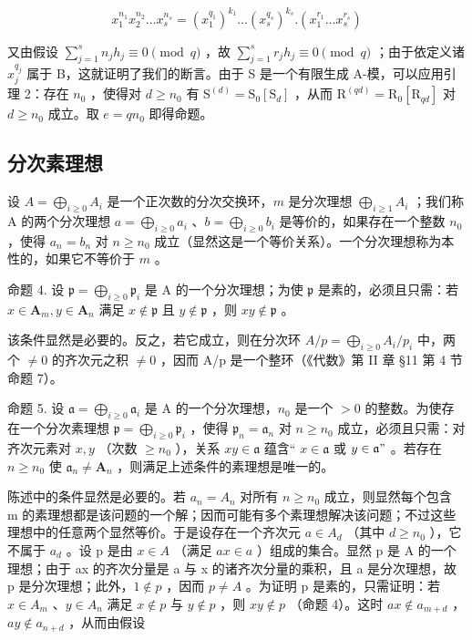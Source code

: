 \[
x _ {1} ^ {n _ {1}} x _ {2} ^ {n _ {2}} \dots x _ {s} ^ {n _ {s}} = (x _ {1} ^ {q _ {1}}) ^ {k _ {1}} \dots (x _ {s} ^ {q _ {s}}) ^ {k _ {s}}. (x _ {1} ^ {r _ {1}} \dots x _ {s} ^ {r _ {s}})
\]

又由假设 \(\sum_{j=1}^{s} n_j h_j \equiv 0 \pmod{q}\) ，故 \(\sum_{j=1}^{s} r_j h_j \equiv 0 \pmod{q}\) ；由于依定义诸 \(x_j^{q_j}\) 属于 B，这就证明了我们的断言。由于 S 是一个有限生成 A-模，可以应用引理 2：存在 \(n_0\) ，使得对 \(d \geqslant n_0\) 有 \(\mathrm{S}^{(d)} = \mathrm{S}_0[\mathrm{S}_d]\) ，从而 \(\mathrm{R}^{(qd)} = \mathrm{R}_0[\mathrm{R}_{qd}]\) 对 \(d \geqslant n_0\) 成立。取 \(e = q n_0\) 即得命题。

\subsection{分次素理想}

设 \(A = \bigoplus_{i \geqslant 0} A_i\) 是一个正次数的分次交换环，\(m\) 是分次理想 \(\bigoplus_{i \geqslant 1} A_i\) ；我们称 A 的两个分次理想 \(a = \bigoplus_{i \geqslant 0} a_i\) 、\(b = \bigoplus_{i \geqslant 0} b_i\) 是等价的，如果存在一个整数 \(n_0\) ，使得 \(a_n = b_n\) 对 \(n \geqslant n_0\) 成立（显然这是一个等价关系）。一个分次理想称为本性的，如果它不等价于 \(m\) 。

命题 4. 设 \(\mathfrak{p} = \bigoplus_{i\geqslant 0}\mathfrak{p}_i\) 是 A 的一个分次理想；为使 \(\mathfrak{p}\) 是素的，必须且只需：若 \(x\in \mathbf{A}_m,y\in \mathbf{A}_n\) 满足 \(x\notin \mathfrak{p}\) 且 \(y\notin \mathfrak{p}\) ，则 \(xy\notin \mathfrak{p}\) 。

该条件显然是必要的。反之，若它成立，则在分次环 \(A/p = \bigoplus_{i \geq 0} A_i/p_i\) 中，两个 \(\neq 0\) 的齐次元之积 \(\neq 0\) ，因而 A/p 是一个整环（《代数》第 II 章 §11 第 4 节命题 7）。

命题 5. 设 \(\mathfrak{a} = \bigoplus_{i\geqslant 0}\mathfrak{a}_i\) 是 A 的一个分次理想，\(n_0\) 是一个 \(>0\) 的整数。为使存在一个分次素理想 \(\mathfrak{p} = \bigoplus_{i\geqslant 0}\mathfrak{p}_i\) ，使得 \(\mathfrak{p}_n = \mathfrak{a}_n\) 对 \(n\geqslant n_0\) 成立，必须且只需：对齐次元素对 \(x,y\) （次数 \(\geqslant n_0\) ），关系 \(xy\in \mathfrak{a}\) 蕴含“ \(x\in \mathfrak{a}\) 或 \(y\in \mathfrak{a}"\) 。若存在 \(n\geqslant n_0\) 使 \(\mathfrak{a}_n\neq \mathbf{A}_n\) ，则满足上述条件的素理想是唯一的。

陈述中的条件显然是必要的。若 \(a_{n} = A_{n}\) 对所有 \(n \geqslant n_{0}\) 成立，则显然每个包含 m 的素理想都是该问题的一个解；因而可能有多个素理想解决该问题；不过这些理想中的任意两个显然等价。于是设存在一个齐次元 \(a \in A_{d}\) （其中 \(d \geqslant n_{0}\) ），它不属于 \(a_{d}\) 。设 p 是由 \(x \in A\) （满足 \(ax \in a\) ）组成的集合。显然 p 是 A 的一个理想；由于 ax 的齐次分量是 a 与 x 的诸齐次分量的乘积，且 a 是分次理想，故 p 是分次理想；此外，\(1 \notin p\) ，因而 \(p \neq A\) 。为证明 p 是素的，只需证明：若 \(x \in A_{m}\) 、\(y \in A_{n}\) 满足 \(x \notin p\) 与 \(y \notin p\) ，则 \(xy \notin p\) （命题 4）。这时 \(ax \notin a_{m+d}\) ，\(ay \notin a_{n+d}\) ，从而由假设

